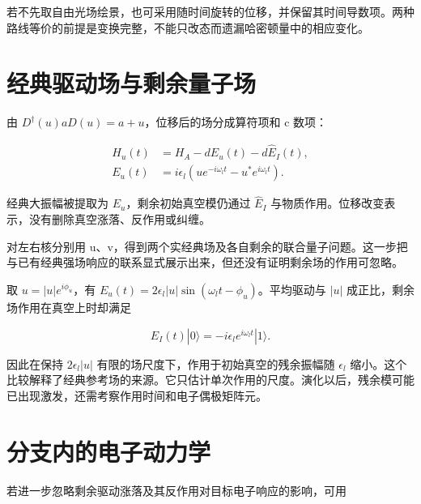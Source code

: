 \documentclass[UTF8,a4paper,zihao=-4,openany,fontset=fandol]{ctexbook}
\begin{document}
若不先取自由光场绘景，也可采用随时间旋转的位移，并保留其时间导数项。两种路线等价的前提是变换完整，不能只改态而遗漏哈密顿量中的相应变化。



\section{经典驱动场与剩余量子场}\label{sec:11:5}


由 $D^\dagger(u)aD(u)=a+u$，位移后的场分成算符项和 c 数项：



\begin{equation*}
\begin{aligned}
H_u(t)&=H_A-dE_u(t)-d\hat E_I(t),\\
E_u(t)&=i\epsilon_l
\left(ue^{-i\omega_lt}-u^*e^{i\omega_lt}\right).
\end{aligned}
\tag{11.3}\label{eq:11.3}
\end{equation*}


经典大振幅被提取为 $E_u$，剩余初始真空模仍通过 $\hat E_I$ 与物质作用。位移改变表示，没有删除真空涨落、反作用或纠缠。



对左右核分别用 u、v，得到两个实经典场及各自剩余的联合量子问题。这一步把与已有经典强场响应的联系显式展示出来，但还没有证明剩余场的作用可忽略。



取 $u=|u|e^{i\phi_u}$，有 $E_u(t)=2\epsilon_l|u|\sin(\omega_lt-\phi_u)$。平均驱动与 $|u|$ 成正比，剩余场作用在真空上时却满足



\begin{equation*}
\hat E_I(t)|0\rangle=-i\epsilon_l e^{i\omega_lt}|1\rangle.
\tag{11.3a}\label{eq:11.3a}
\end{equation*}


因此在保持 $2\epsilon_l|u|$ 有限的场尺度下，作用于初始真空的残余振幅随 $\epsilon_l$ 缩小。这个比较解释了经典参考场的来源。它只估计单次作用的尺度。演化以后，残余模可能已出现激发，还需考察作用时间和电子偶极矩阵元。



\section{分支内的电子动力学}\label{sec:11:6}


若进一步忽略剩余驱动涨落及其反作用对目标电子响应的影响，可用
\end{document}
